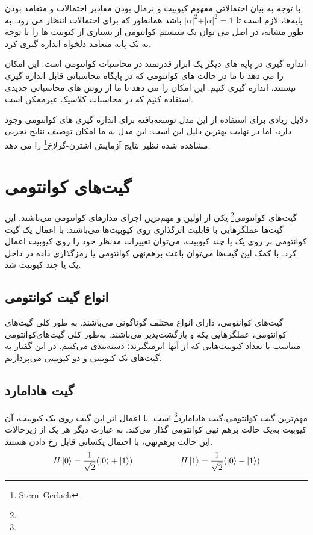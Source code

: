 \documentclass{book}
\begin{document}
با توجه به بیان احتمالاتی مفهوم کیوبیت و نرمال بودن مقادیر احتمالات و متعامد بودن پایه‌ها، لازم است تا $\vert\alpha\vert ^ 2 + \vert\alpha\vert ^ 2 = 1$ باشد همانطور که برای احتمالات انتظار می رود. به طور مشابه، در اصل می توان یک سیستم کوانتومی از بسیاری از کیوبیت ها را با توجه به یک پایه متعامد دلخواه اندازه گیری کرد.

اندازه گیری در پایه های دیگر یک ابزار قدرتمند در محاسبات کوانتومی است. این امکان را می دهد تا ما در حالت های کوانتومی که در پایگاه محاسباتی قابل اندازه گیری نیستند، اندازه گیری کنیم. این امکان را می دهد تا ما از روش های محاسباتی جدیدی استفاده کنیم که در محاسبات کلاسیک غیرممکن است.

دلایل زیادی برای استفاده از این مدل توسعه‌یافته برای اندازه گیری های کوانتومی وجود دارد، اما در نهایت بهترین دلیل این است: این مدل به ما امکان توصیف نتایج تجربی مشاهده شده نظیر نتایج آزمایش اشترن-گرلاخ\footnote{Stern–Gerlach} را می دهد.

\newpage
\section{گیت‌های کوانتومی}
گیت‌های کوانتومی\footnote{} یکی از اولین و مهم‌ترین اجزای‌ مدار‌های کوانتومی ‌می‌باشند. این گیت‌ها عملگر‌هایی با قابلیت اثر‌گذاری روی کیوبیت‌ها می‌باشند. با اعمال یک گیت کوانتومی بر روی یک یا چند کیوبیت، می‌توان تغییرات مدنظر خود را روی کیوبیت اعمال کرد. با کمک این گیت‌ها می‌توان باعث برهم‌نهی کوانتومی یا رمز‌گذاری داده در داخل یک یا چند کیوبیت شد.

\subsection{انواع گیت کوانتومی}
گیت‌های کوانتومی، دارای انواع مختلف گوناگونی می‌باشند. به طور کلی گیت‌های کوانتومی، عملگر‌هایی یکه و بازگشت‌پذیر می‌باشند. به‌طور کلی گیت‌های‌کوانتومی متناسب با تعداد کیوبیت‌هایی که از آنها اثر‌میگیرند؛ دسته‌بندی می‌کنیم. در این گفتار به گیت‌های تک کیوبیتی و دو کیوبیتی می‌پردازیم.
\subsection*{گیت هادامارد}
مهم‌ترین گیت کوانتومی،‌گیت هادامارد\footnote{} است. با اعمال اثر این گیت روی یک کیوبیت، آن کیوبیت به‌یک حالت برهم نهی‌ کوانتومی‌ گذار‌ می‌کند. به عبارت دیگر هر یک از زیرحالات این حالت برهم‌نهی، با احتمال یکسانی قابل رخ دادن‌ هستند. 
\vspace{1cm}
$$
H\ket{0} = \frac{1}{\sqrt{2}} (\ket{0} + \ket{1})
\hspace{2cm}
H\ket{1} = \frac{1}{\sqrt{2}} (\ket{0} - \ket{1})
$$
\vspace{1cm}
\end{document}

